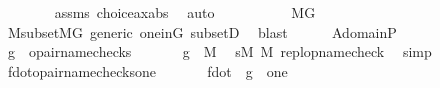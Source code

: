 \begin{isabellebody}
\ \ \ \ \ \ \isamarkupfalse%
\ assms\ choice{\isacharunderscore}{\kern0pt}ax{\isacharunderscore}{\kern0pt}abs\ \isamarkupfalse%
\ auto\isanewline
\ \ \ \ \isamarkupfalse%
\isanewline
\ \ \ \ \isamarkupfalse%
\ {\isachardoublequoteopen}{\isasymalpha}{\isasymin}M{\isacharbrackleft}{\kern0pt}G{\isacharbrackright}{\kern0pt}{\isachardoublequoteclose}\ \ \ \ \ \ \ \ \ \isanewline
\ \ \ \ \ \ \isamarkupfalse%
\ M{\isacharunderscore}{\kern0pt}subset{\isacharunderscore}{\kern0pt}MG\ generic\ one{\isacharunderscore}{\kern0pt}in{\isacharunderscore}{\kern0pt}G\ subsetD\ \isamarkupfalse%
\ blast\isanewline
\ \ \ \ \isamarkupfalse%
\ {\isacharquery}{\kern0pt}A{\isacharequal}{\kern0pt}{\isachardoublequoteopen}domain{\isacharparenleft}{\kern0pt}{\isasymtau}{\isacharparenright}{\kern0pt}{\isasymtimes}P{\isachardoublequoteclose}\isanewline
\ \ \ \ \isamarkupfalse%
\ {\isacharquery}{\kern0pt}g\ {\isacharequal}{\kern0pt}\ {\isachardoublequoteopen}{\isacharbraceleft}{\kern0pt}opair{\isacharunderscore}{\kern0pt}name{\isacharparenleft}{\kern0pt}check{\isacharparenleft}{\kern0pt}{\isasymbeta}{\isacharparenright}{\kern0pt}{\isacharcomma}{\kern0pt}s{\isacharbackquote}{\kern0pt}{\isasymbeta}{\isacharparenright}{\kern0pt}{\isachardot}{\kern0pt}\ {\isasymbeta}{\isasymin}{\isasymalpha}{\isacharbraceright}{\kern0pt}{\isachardoublequoteclose}\isanewline
\ \ \ \ \isamarkupfalse%
\ {\isachardoublequoteopen}{\isacharquery}{\kern0pt}g\ {\isasymin}\ M{\isachardoublequoteclose}\ \isamarkupfalse%
\ {\isacartoucheopen}s{\isasymin}M{\isacartoucheclose}\ {\isacartoucheopen}{\isasymalpha}{\isasymin}M{\isacartoucheclose}\ repl{\isacharunderscore}{\kern0pt}opname{\isacharunderscore}{\kern0pt}check\ \isamarkupfalse%
\ simp\isanewline
\ \ \ \ \isamarkupfalse%
\ {\isacharquery}{\kern0pt}f{\isacharunderscore}{\kern0pt}dot{\isacharequal}{\kern0pt}{\isachardoublequoteopen}{\isacharbraceleft}{\kern0pt}{\isasymlangle}opair{\isacharunderscore}{\kern0pt}name{\isacharparenleft}{\kern0pt}check{\isacharparenleft}{\kern0pt}{\isasymbeta}{\isacharparenright}{\kern0pt}{\isacharcomma}{\kern0pt}s{\isacharbackquote}{\kern0pt}{\isasymbeta}{\isacharparenright}{\kern0pt}{\isacharcomma}{\kern0pt}one{\isasymrangle}{\isachardot}{\kern0pt}\ {\isasymbeta}{\isasymin}{\isasymalpha}{\isacharbraceright}{\kern0pt}{\isachardoublequoteclose}\isanewline
\ \ \ \ \isamarkupfalse%
\ {\isachardoublequoteopen}{\isacharquery}{\kern0pt}f{\isacharunderscore}{\kern0pt}dot\ {\isacharequal}{\kern0pt}\ {\isacharquery}{\kern0pt}g\ {\isasymtimes}\ {\isacharbraceleft}{\kern0pt}one{\isacharbraceright}{\kern0pt}{\isachardoublequoteclose}\ \isamarkupfalse%

\end{isabellebody}
